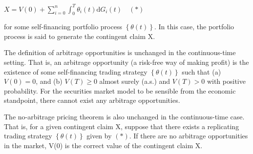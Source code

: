 \documentclass[a4paper,12pt]{article} %
\begin{document}
$X = V(0) + \sum_{i=0}^{n}\int_{0}^{T}\theta _i(t)\mathrm{d}G_i(t)\quad(\ast)$


for some self-financing portfolio process $\left \{ \theta (t) \right \}$. In this case, the portfolio process is said to generate the contingent claim X.


The definition of arbitrage opportunities is unchanged in the continuous-time setting. That is, an arbitrage opportunity (a risk-free way of making profit) is the existence of some self-financing trading strategy $\left \{ \theta (t) \right \}$ such that (a) $V(0) = 0$, and (b) $V(T)\geqslant 0$ almost surely (a.s.) and $V(T)> 0$ with positive probability. For the securities market model to be sensible from the economic standpoint, there cannot exist any arbitrage opportunities.

The no-arbitrage pricing theorem is also unchanged in the continuous-time case. That is, for a given contingent claim X, suppose that there exists a replicating trading strategy $\left \{ \theta (t) \right \}$ given by $(\ast)$. If there are no arbitrage opportunities in the market, V(0) is the correct value of the contingent claim X.
\end{document}
